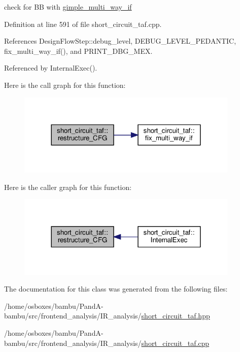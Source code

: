 check for BB with \hyperlink{structgimple__multi__way__if}{gimple\+\_\+multi\+\_\+way\+\_\+if} 

Definition at line 591 of file short\+\_\+circuit\+\_\+taf.\+cpp.



References Design\+Flow\+Step\+::debug\+\_\+level, D\+E\+B\+U\+G\+\_\+\+L\+E\+V\+E\+L\+\_\+\+P\+E\+D\+A\+N\+T\+IC, fix\+\_\+multi\+\_\+way\+\_\+if(), and P\+R\+I\+N\+T\+\_\+\+D\+B\+G\+\_\+\+M\+EX.



Referenced by Internal\+Exec().

Here is the call graph for this function\+:
\nopagebreak
\begin{figure}[H]
\begin{center}
\leavevmode
\includegraphics[width=300pt]{dd/d1c/classshort__circuit__taf_a9f88813508d66f82309a90b24788f3f1_cgraph}
\end{center}
\end{figure}
Here is the caller graph for this function\+:
\nopagebreak
\begin{figure}[H]
\begin{center}
\leavevmode
\includegraphics[width=300pt]{dd/d1c/classshort__circuit__taf_a9f88813508d66f82309a90b24788f3f1_icgraph}
\end{center}
\end{figure}


The documentation for this class was generated from the following files\+:\begin{DoxyCompactItemize}
\item 
/home/osboxes/bambu/\+Pand\+A-\/bambu/src/frontend\+\_\+analysis/\+I\+R\+\_\+analysis/\hyperlink{short__circuit__taf_8hpp}{short\+\_\+circuit\+\_\+taf.\+hpp}\item 
/home/osboxes/bambu/\+Pand\+A-\/bambu/src/frontend\+\_\+analysis/\+I\+R\+\_\+analysis/\hyperlink{short__circuit__taf_8cpp}{short\+\_\+circuit\+\_\+taf.\+cpp}\end{DoxyCompactItemize}
